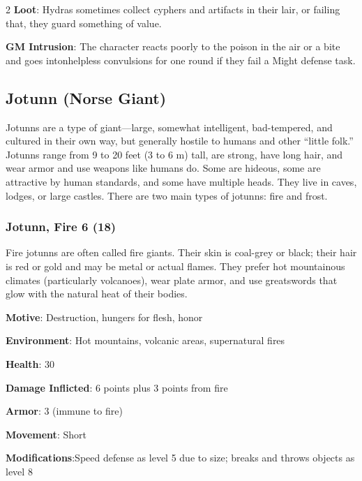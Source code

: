 \begin{multicols}{2}
\textbf{Loot}: Hydras sometimes collect cyphers and artifacts in their lair, or failing that, they guard something of value.

\textbf{GM Intrusion}: The character reacts poorly to the poison in the air or a bite and goes intonhelpless convulsions for one round if they fail a Might defense task.

\subsection{Jotunn (Norse Giant)}

Jotunns are a type of giant—large, somewhat intelligent, bad-tempered, and cultured in their own way, but generally hostile to humans and other “little folk.” Jotunns range from 9 to 20 feet (3 to 6 m) tall, are strong, have long hair, and wear armor and use weapons like humans do. Some are hideous, some are attractive by human standards, and some have multiple heads. They live in caves, lodges, or large castles. There are two main types of jotunns: fire and frost.

\subsubsection{Jotunn, Fire 6 (18)}

Fire jotunns are often called fire giants. Their skin is coal-grey or black; their hair is red or gold and may be metal or actual flames. They prefer hot mountainous climates (particularly volcanoes), wear plate armor, and use greatswords that glow with the natural heat of their bodies. 

\textbf{Motive}: Destruction, hungers for flesh, honor 

\textbf{Environment}: Hot mountains, volcanic areas, supernatural fires 

\textbf{Health}: 30 

\textbf{Damage Inflicted}: 6 points plus 3 points from fire 

\textbf{Armor}: 3 (immune to fire) 

\textbf{Movement}: Short 

\textbf{Modifications}:Speed defense as level 5 due to size; breaks and throws objects as level 8 


\end{multicols}
